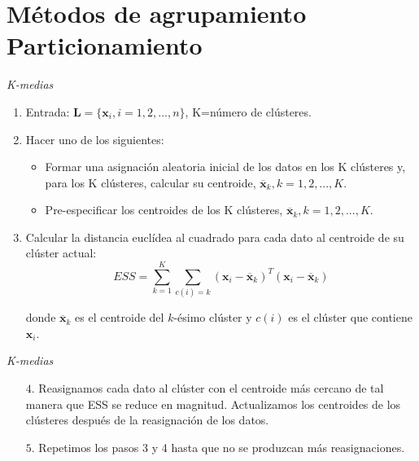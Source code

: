 \documentclass[spanish]{beamer}
\begin{document}
\section{Métodos de agrupamiento\\ Particionamiento}





\begin{frame}{\textit{K-medias}}
\begin{enumerate}
\item Entrada: $\textbf{L}=\{\textbf{x}_i,i=1,2,...,n\}$, K=número de clústeres.

\item Hacer uno de los siguientes:
\begin{itemize}
\item Formar una asignación aleatoria inicial de los datos en los K clústeres y, para los K clústeres, calcular su centroide, $\overline{\textbf{x}}_k, k=1,2,...,K$.
\item Pre-especificar los centroides de los K clústeres, $\overline{\textbf{x}}_k, k=1,2,...,K$.
\end{itemize}
\item Calcular la distancia euclídea al cuadrado para cada dato al centroide de su clúster actual:
$$ESS=\sum_{k=1}^{K}\sum_{c(i)=k}(\textbf{x}_i - \overline{\textbf{x}}_k)^T(\textbf{x}_i - \overline{\textbf{x}}_k)$$

donde $\overline{\textbf{x}}_k$ es el centroide del $k$-ésimo clúster y $c(i)$ es el clúster que contiene $\textbf{x}_i$.

\end{enumerate}
\end{frame}


\begin{frame}{\textit{K-medias}}
\begin{enumerate}

\item[$4.$] Reasignamos cada dato al clúster con el centroide más cercano de tal manera que ESS se reduce en magnitud. Actualizamos los centroides de los clústeres después de la reasignación de los datos. 
\item[$5.$] Repetimos los pasos 3 y 4 hasta que no se produzcan más reasignaciones.
\end{enumerate}

\end{frame}
\end{document}
